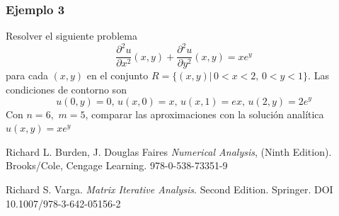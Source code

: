 \documentclass[a4paper]{article}
\begin{document}
\subsubsection{Ejemplo 3}
Resolver el siguiente problema 
\begin{equation}
\frac{\partial^2 u}{\partial x^2}(x,y)+\frac{\partial^2 u}{\partial y^2}(x,y)=x e^{y}
\end{equation}
para cada $(x,y)$ en el conjunto $R=\{ (x,y)|\, 0<x<2,\, 0<y<1 \}$. Las condiciones de contorno  son 
\begin{equation*}
u(0,y)=0,\,u(x,0)=x,\, u(x,1)=ex,\, u(2,y)=2e^y
\end{equation*}
Con $n=6,\,\,m=5$, comparar las aproximaciones con la solución analítica $u(x,y)=x e^y$



\begin{thebibliography}{99}


 Richard L. Burden, J. Douglas Faires \textit{Numerical Analysis}, (Ninth Edition). Brooks/Cole, Cengage Learning. 978-0-538-73351-9

 Richard S. Varga. \textit{Matrix Iterative Analysis}. Second Edition. Springer. DOI 10.1007/978-3-642-05156-2






\end{thebibliography}
\end{document}
